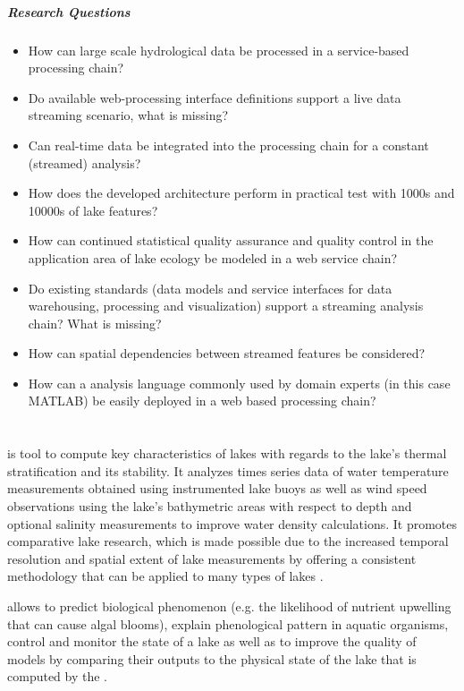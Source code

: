\paragraph*{Research Questions}
\begin{itemize}
  \item How can large scale hydrological data be processed in a service-based processing chain?
  \item Do available web-processing interface definitions support a live data streaming scenario, what is missing?
  \item Can real-time data be integrated into the processing chain for a constant (streamed) analysis?
  \item How does the developed architecture perform in practical test with 1000s and 10000s of lake features?
  \item How can continued statistical quality assurance and quality control in the application area of lake ecology be modeled in a web service chain?
  \item Do existing standards (data models and service interfaces for data warehousing, processing and visualization) support a streaming analysis chain? What is missing?
  \item How can spatial dependencies between streamed features be considered?
  \item How can a analysis language commonly used by domain experts (in this case MATLAB) be easily deployed in a web based processing chain?
\end{itemize}

\chapter{\la}
\la is tool to compute key characteristics of lakes with regards to the lake's thermal stratification and its stability. It analyzes times series data of water temperature measurements obtained using instrumented lake buoys as well as wind speed observations using the lake's bathymetric areas with respect to depth and optional salinity measurements to improve water density calculations. It promotes comparative lake research, which is made possible due to the increased temporal resolution and spatial extent of lake measurements by offering a consistent methodology that can be applied to many types of lakes \citep{read2011derivation}.

\la allows to predict biological phenomenon (e.g. the likelihood of nutrient upwelling that can cause algal blooms), explain phenological pattern in aquatic organisms, control and monitor the state of a lake as well as to improve the quality of models by comparing their outputs to the physical state of the lake that is computed by the \la.

